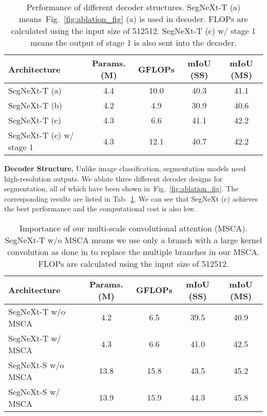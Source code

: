 \documentclass{article}
\newcommand{\figref}[1]{Fig.~\ref{#1}}
\newcommand{\tabref}[1]{Tab.~\ref{#1}}
\begin{document}
\begin{table}[ht]\centering
\renewcommand{\arraystretch}{1}
\renewcommand{\tabcolsep}{3mm}
\caption{Performance of different decoder structures. 
SegNeXt-T (a) means~\figref{fig:ablation_fig} (a) is used in decoder.
FLOPs are calculated using the input size of 512512.
SegNeXt-T (c) w/ stage 1 means the output of stage 1 is also sent into the decoder.
}
\begin{tabular}{l|cc|cc}
    \toprule
	Architecture & Params. (M) & GFLOPs & mIoU (SS) & mIoU (MS)  \\ \midrule
	SegNeXt-T (a)            & 4.4 & 10.0 & 40.3 & 41.1 \\ 
	SegNeXt-T (b)            & 4.2 & 4.9  & 30.9 & 40.6 \\ 
	SegNeXt-T (c)            & 4.3 & 6.6  & 41.1 & 42.2 \\ 
	SegNeXt-T (c) w/ stage 1 & 4.3 & 12.1 & 40.7 & 42.2 \\ 
    \bottomrule
\end{tabular}
\label{tab:ablation_architecture}
\end{table}


\textbf{Decoder Structure.} Unlike image classification, segmentation models need
high-resolution outputs. We ablate three different decoder designs for segmentation,
all of which have been shown in~\figref{fig:ablation_fig}.
The corresponding results are listed in \tabref{tab:ablation_architecture}.
We can see that SegNeXt (c) achieves the best performance and the computational cost
is also low.


\begin{table}[ht]\centering
\renewcommand{\arraystretch}{1}
\renewcommand{\tabcolsep}{3mm}
\caption{Importance of our multi-scale convolutional attention (MSCA). 
SegNeXt-T w/o MSCA means we use only a branch with a large kernel convolution
as done in \cite{guo2022visual} to replace the multiple branches in our MSCA.
FLOPs are calculated using the input size of 512512.
}
\begin{tabular}{l|cc|cc}
    \toprule
	Architecture & Params. (M) & GFLOPs & mIoU (SS) & mIoU (MS)  \\ \midrule
	SegNeXt-T w/o MSCA & 4.2 & 6.5 & 39.5 & 40.9 \\ 
	SegNeXt-T w/ MSCA & 4.3 & 6.6 & 41.0 & 42.5 \\  \midrule
	SegNeXt-S w/o MSCA & 13.8 & 15.8 & 43.5 & 45.2 \\ 
	SegNeXt-S w/ MSCA & 13.9 & 15.9 & 44.3 & 45.8 \\ 
    \bottomrule
\end{tabular}
\label{tab:multi_scale}
\vspace{-0.3cm}
\end{table}
\end{document}
